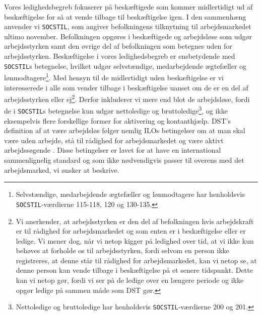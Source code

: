 Vores ledighedsbegreb fokuserer på beskæftigede som kommer midlertidigt ud af beskæftigelse for så at vende tilbage til beskæftigelse igen. I den sammenhæng anvender vi \texttt{SOCSTIL}, som angiver befolkningens tilknytning til arbejdsmarkedet ultimo november. Befolkningen opgøres i beskæftigede og arbejdsløse som udgør arbejdsstyrken samt den øvrige del af befolkningen som betegnes uden for arbejdsstyrken. Beskæftigelse i vores ledighedsbegreb er ensbetydende med \texttt{SOCSTIL}s betegnelse, hvilket udgør selvstændige, medarbejdende ægtefæller og lønmodtagere\footnote{Selvstændige, medarbejdende ægtefæller og lønmodtagere har henholdsvis \texttt{SOCSTIL}-værdierne 115-118, 120 og 130-135.}. Med hensyn til de midlertidigt uden beskæftigelse er vi interesserede i alle som vender tilbage i beskæftigelse uanset om de er en del af arbejdsstyrken eller ej\footnote{Vi anerkender, at arbejdsstyrken er den del af befolkningen hvis arbejdskraft er til rådighed for arbejdsmarkedet og som enten er i beskæftigelse eller er ledige. Vi mener dog, når vi netop kigger på ledighed over tid, at vi ikke kun behøves at forholde os til arbejdsstyrken, fordi selvom en person ikke registreres, at denne står til rådighed for arbejdsmarkedet, kan vi netop se, at denne person kan vende tilbage i beskæftigelse på et senere tidspunkt. Dette kan vi netop gør, fordi vi ser på de ledige over en længere periode og ikke opgør ledige på sammen måde som DST gør.}. Derfor inkluderer vi mere end blot de arbejdsløse, fordi de i \texttt{SOCSTIL}s betegnelse kun udgør nettoledige og bruttoledige\footnote{Nettoledige og bruttoledige har henholdsvis \texttt{SOCSTIL}-værdierne 200 og 201.}, og ikke eksempelvis flere forskellige former for aktivering og kontanthjælp. DST's definition af at være arbejdsløs følger nemlig ILOs betingelser om at man skal være uden arbejde, stå til rådighed for arbejdsmarkedet og være aktivt arbejdssøgende \parencite{ILO1982}. Disse betingelser er lavet for at have en international sammenlignelig standard og som ikke nødvendigvis passer til overens med det arbejdsmarked, vi ønsker at beskrive.

